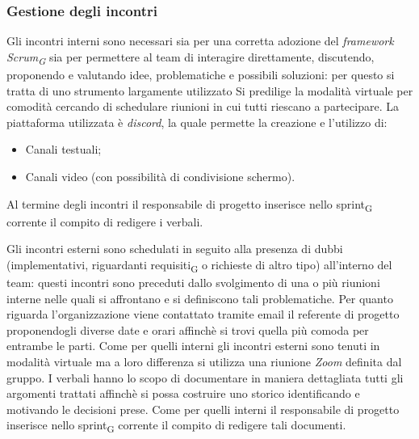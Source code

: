     \subsubsection{Gestione degli incontri}
        Gli incontri interni sono necessari sia per una corretta adozione del \textit{framework Scrum\textsubscript{G}}
        sia per permettere al team di interagire direttamente, discutendo, proponendo e valutando idee, problematiche e possibili 
        soluzioni: per questo si tratta di uno strumento largamente utilizzato
        \newline
        Si predilige la modalità virtuale per comodità cercando di schedulare riunioni in cui tutti riescano a partecipare.
        \newline
        La piattaforma utilizzata è \textit{discord}, la quale permette la creazione e l'utilizzo di:
        \begin{itemize}
            \item Canali testuali;
            \item Canali video (con possibilità di condivisione schermo).
        \end{itemize}
        Al termine degli incontri il responsabile di progetto inserisce nello sprint\textsubscript{G} corrente il compito di redigere i verbali. 

        Gli incontri esterni sono schedulati in seguito alla presenza di dubbi (implementativi, riguardanti requisiti\textsubscript{G} o richieste di altro tipo) all'interno del 
        team: questi incontri sono preceduti dallo svolgimento di una o più riunioni interne nelle quali si affrontano e si definiscono tali problematiche.
        \newline
        Per quanto riguarda l'organizzazione viene contattato tramite email il referente di progetto proponendogli diverse date e orari affinchè si trovi quella 
        più comoda per entrambe le parti. 
        \newline
        Come per quelli interni gli incontri esterni sono tenuti in modalità virtuale ma a loro differenza si utilizza una riunione \textit{Zoom} definita dal gruppo. 
        \newline
        I verbali hanno lo scopo di documentare in maniera dettagliata tutti gli argomenti trattati affinchè si possa costruire uno storico identificando
        e motivando le decisioni prese.
        \newline
        Come per quelli interni il responsabile di progetto inserisce nello sprint\textsubscript{G} corrente il compito di redigere tali documenti.

